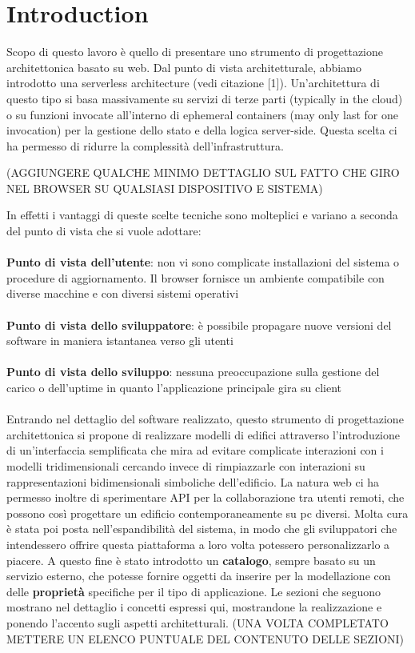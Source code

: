 \section{Introduction}

Scopo di questo lavoro \`e quello di presentare uno strumento di progettazione architettonica basato su web. Dal punto di vista architetturale, abbiamo introdotto una serverless architecture (vedi citazione [1]). Un'architettura di questo tipo si basa massivamente su servizi di terze parti (typically in the cloud) o su funzioni invocate all'interno di ephemeral containers (may only last for one invocation) per la gestione dello stato e della logica server-side. Questa scelta ci ha permesso di ridurre la complessit\`a dell'infrastruttura.




(AGGIUNGERE QUALCHE MINIMO DETTAGLIO SUL FATTO CHE GIRO NEL BROWSER SU QUALSIASI DISPOSITIVO E SISTEMA)


In effetti i vantaggi di queste scelte tecniche sono molteplici e variano a seconda del punto di vista che si vuole adottare:
\\\\
\textbf{Punto di vista dell'utente}: non vi sono complicate installazioni del sistema o procedure di aggiornamento. Il browser fornisce un ambiente compatibile con diverse macchine e con diversi sistemi operativi\\
\\
\textbf{Punto di vista dello sviluppatore}: \`e possibile propagare nuove versioni del software in maniera istantanea verso gli utenti\\
\\
\textbf{Punto di vista dello sviluppo}: nessuna preoccupazione sulla gestione del carico o dell'uptime in quanto l'applicazione principale gira su client\\\\
Entrando nel dettaglio del software realizzato, questo strumento di progettazione architettonica si propone di realizzare modelli di edifici attraverso l'introduzione di un'interfaccia semplificata che mira ad evitare complicate interazioni con i modelli tridimensionali cercando invece di rimpiazzarle con interazioni su rappresentazioni bidimensionali simboliche dell'edificio.
La natura web ci ha permesso inoltre di sperimentare API per la collaborazione tra utenti remoti, che possono cos\`i progettare un edificio contemporaneamente su pc diversi.
Molta cura \`e stata poi posta nell'espandibilit\`a del sistema, in modo che gli sviluppatori che intendessero offrire questa piattaforma a loro volta potessero personalizzarlo a piacere. A questo fine \`e stato introdotto un \textbf{catalogo}, sempre basato su un servizio esterno, che potesse fornire oggetti da inserire per la modellazione con delle \textbf{propriet\`a} specifiche per il tipo di applicazione.
Le sezioni che seguono mostrano nel dettaglio i concetti espressi qui, mostrandone la realizzazione e ponendo l'accento sugli aspetti architetturali. (UNA VOLTA COMPLETATO METTERE UN ELENCO PUNTUALE DEL CONTENUTO DELLE SEZIONI)
